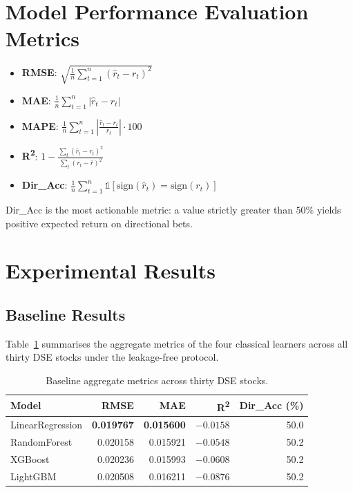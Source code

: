 \documentclass[12pt,a4paper,oneside]{report}
\begin{document}
\section{Model Performance Evaluation Metrics}
\label{sec:metrics}

\begin{itemize}[leftmargin=*,itemsep=2pt]
  \item \textbf{\ac{RMSE}}:
        $\sqrt{\frac{1}{n}\sum_{t=1}^{n}(\hat r_t - r_t)^2}$
  \item \textbf{\ac{MAE}}:
        $\frac{1}{n}\sum_{t=1}^{n} |\hat r_t - r_t|$
  \item \textbf{\ac{MAPE}}:
        $\frac{1}{n}\sum_{t=1}^{n} \left|\frac{\hat r_t - r_t}{r_t}\right| \cdot 100$
  \item \textbf{\texorpdfstring{R\textsuperscript{2}}{R²}}:
        $1 - \frac{\sum_{t}(\hat r_t - r_t)^2}{\sum_{t}(r_t - \bar r)^2}$
  \item \textbf{Dir\_Acc}:
        $\frac{1}{n}\sum_{t=1}^{n} \mathbb{1}\!\left[\mathrm{sign}(\hat r_t) = \mathrm{sign}(r_t)\right]$
\end{itemize}

Dir\_Acc is the most actionable metric: a value strictly greater
than $50\%$ yields positive expected return on directional bets.

\section{Experimental Results}

\subsection{Baseline Results}

Table~\ref{tab:phase3} summarises the aggregate metrics of the four
classical learners across all thirty DSE stocks under the
leakage-free protocol.

\begin{table}[H]
  \centering
  \caption{Baseline aggregate metrics across thirty DSE stocks.}
  \label{tab:phase3}
  \begin{tabular}{lrrrr}
    \toprule
    Model & \ac{RMSE} & \ac{MAE} & R\textsuperscript{2} & Dir\_Acc (\%) \\
    \midrule
    LinearRegression & \textbf{0.019767} & \textbf{0.015600} & $-0.0158$ & 50.0 \\
    RandomForest     & 0.020158 & 0.015921 & $-0.0548$ & 50.2 \\
    XGBoost          & 0.020236 & 0.015993 & $-0.0608$ & 50.2 \\
    LightGBM         & 0.020508 & 0.016211 & $-0.0876$ & 50.2 \\
    \bottomrule
  \end{tabular}
\end{table}
\end{document}
